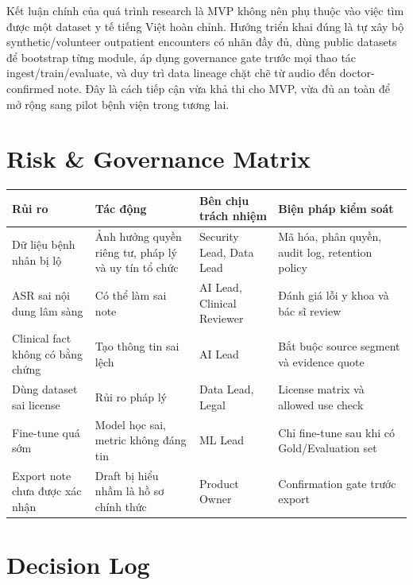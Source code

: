 \documentclass[12pt,a4paper]{article}
\begin{document}
Kết luận chính của quá trình research là MVP không nên phụ thuộc vào việc tìm được một dataset y tế tiếng Việt hoàn chỉnh. Hướng triển khai đúng là tự xây bộ synthetic/volunteer outpatient encounters có nhãn đầy đủ, dùng public datasets để bootstrap từng module, áp dụng governance gate trước mọi thao tác ingest/train/evaluate, và duy trì data lineage chặt chẽ từ audio đến doctor-confirmed note. Đây là cách tiếp cận vừa khả thi cho MVP, vừa đủ an toàn để mở rộng sang pilot bệnh viện trong tương lai.



\section{Risk \& Governance Matrix}

\begin{longtable}{p{3.5cm} p{3.5cm} p{3cm} p{4cm}}
\toprule
\textbf{Rủi ro} & \textbf{Tác động} & \textbf{Bên chịu trách nhiệm} & \textbf{Biện pháp kiểm soát} \\
\midrule
Dữ liệu bệnh nhân bị lộ & Ảnh hưởng quyền riêng tư, pháp lý và uy tín tổ chức & Security Lead, Data Lead & Mã hóa, phân quyền, audit log, retention policy \\
\midrule
ASR sai nội dung lâm sàng & Có thể làm sai note & AI Lead, Clinical Reviewer & Đánh giá lỗi y khoa và bác sĩ review \\
\midrule
Clinical fact không có bằng chứng & Tạo thông tin sai lệch & AI Lead & Bắt buộc source segment và evidence quote \\
\midrule
Dùng dataset sai license & Rủi ro pháp lý & Data Lead, Legal & License matrix và allowed use check \\
\midrule
Fine-tune quá sớm & Model học sai, metric không đáng tin & ML Lead & Chỉ fine-tune sau khi có Gold/Evaluation set \\
\midrule
Export note chưa được xác nhận & Draft bị hiểu nhầm là hồ sơ chính thức & Product Owner & Confirmation gate trước export \\
\bottomrule
\end{longtable}

\section{Decision Log}
\end{document}

